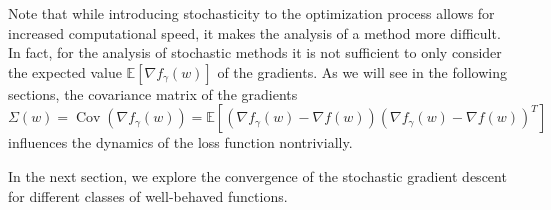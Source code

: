 \documentclass[12pt]{article}
\theoremstyle{definition}
\newtheorem{definition}[definition]{Definition}
\numberwithin{equation}{section}
\newcommand{\R}{\mathbb{R}}
\newcommand{\ev}[1]{\mathbb{E}\left[{#1}\right]}
\DeclareMathOperator{\Cov}{Cov}
\begin{document}
Note that while introducing stochasticity to the optimization process allows for increased computational speed, it makes the analysis of a method more difficult. In fact, for the analysis of stochastic methods it is not sufficient to only consider the expected value $\ev{\nabla f_{\gamma}(w)}$ of the gradients. As we will see in the following sections, the covariance matrix of the gradients $\Sigma(w) = \Cov(\nabla f_\gamma(w)) = \ev{(\nabla f_{\gamma}(w) - \nabla f(w)){(\nabla f_{\gamma}(w) - \nabla f(w))}^T}$ influences the dynamics of the loss function nontrivially.


In the next section, we explore the convergence of the stochastic gradient descent for different classes of well-behaved functions.
\end{document}

